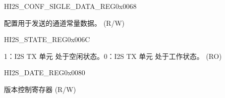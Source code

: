 \begin{register}{H}{I2S\_CONF\_SIGLE\_DATA\_REG}{0x0068}\label{regdesc:I2SCONFSIGLEDATAREG}
%
\regnewline%
\begin{regdesc}\begin{reglist}
\label{fielddesc:I2SSINGLEDATA}\item [I2S\_SINGLE\_DATA] 配置用于发送的通道常量数据。 (R/W)
\end{reglist}\end{regdesc}
\end{register}


\begin{register}{H}{I2S\_STATE\_REG}{0x006C}\label{regdesc:I2SSTATEREG}
%
%
\regnewline%
\begin{regdesc}\begin{reglist}
\label{fielddesc:I2STXIDLE}\item [I2S\_TX\_IDLE] 1：I2S TX 单元 处于空闲状态。0：I2S TX 单元 处于工作状态。 (RO)
\end{reglist}\end{regdesc}
\end{register}


\begin{register}{H}{I2S\_DATE\_REG}{0x0080}\label{regdesc:I2SDATEREG}
%
%
\regnewline%
\begin{regdesc}\begin{reglist}
\label{fielddesc:I2SDATE}\item [I2S\_DATE] 版本控制寄存器 (R/W)
\end{reglist}\end{regdesc}
\end{register}
